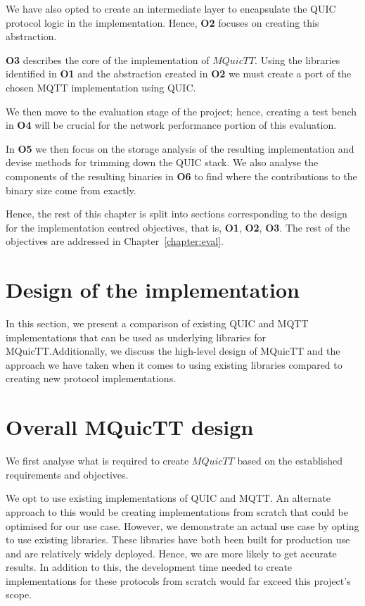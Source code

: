 We have also opted to create an intermediate layer to encapsulate the QUIC protocol logic in the implementation.
Hence, \textbf{O2} focuses on creating this abstraction.

\textbf{O3} describes the core of the implementation of $MQuicTT$.
Using the libraries identified in \textbf{O1} and the abstraction created in \textbf{O2} we must create a port of the chosen MQTT implementation using QUIC.

We then move to the evaluation stage of the project; hence, creating a test bench in \textbf{O4} will be crucial for the network performance portion of this evaluation.

In \textbf{O5} we then focus on the storage analysis of the resulting implementation and devise methods for trimming down the QUIC stack.
We also analyse the components of the resulting binaries in \textbf{O6} to find where the contributions to the binary size come from exactly.

Hence, the rest of this chapter is split into sections corresponding to the design for the implementation centred objectives, that is, \textbf{O1}, \textbf{O2}, \textbf{O3}.
The rest of the objectives are addressed in Chapter~\ref{chapter:eval}.

\section{Design of the implementation}

In this section, we present a comparison of existing QUIC and MQTT implementations that can be used as underlying libraries for MQuicTT.Additionally, we discuss the high-level design of MQuicTT and the approach we have taken when it comes to using existing libraries compared to creating new protocol implementations.

\section{Overall MQuicTT design} \label{sec:mquictt_design}

We first analyse what is required to create $MQuicTT$ based on the established requirements and objectives.

We opt to use existing implementations of QUIC and MQTT.
An alternate approach to this would be creating implementations from scratch that could be optimised for our use case.
However, we demonstrate an actual use case by opting to use existing libraries.
These libraries have both been built for production use and are relatively widely deployed.
Hence, we are more likely to get accurate results.
In addition to this, the development time needed to create implementations for these protocols from scratch would far exceed this project's scope.

